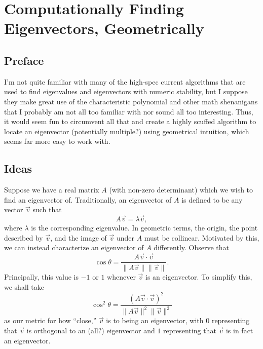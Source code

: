 \documentclass[a4paper, 12pt]{article}
\begin{document}
\section*{Computationally Finding Eigenvectors, Geometrically}

\subsection*{Preface}
I'm not quite familiar with many of the high-spec current algorithms that are used to find eigenvalues and eigenvectors with numeric stability, but I suppose they make great use of the characteristic polynomial and other math shenanigans that I probably am not all too familiar with nor sound all too interesting. Thus, it would seem fun to circumvent all that and create a highly scuffed algorithm to locate an eigenvector (potentially multiple?) using geometrical intuition, which seems far more easy to work with.

\subsection*{Ideas}
Suppose we have a real matrix \( A \) (with non-zero determinant) which we wish to find an eigenvector of. Traditionally, an eigenvector of \( A \) is defined to be any vector \( \vec{v} \) such that
\[
    A \vec{v} = \lambda \vec{v}
,\]
where \( \lambda \) is the corresponding eigenvalue. In geometric terms, the origin, the point described by \( \vec{v} \), and the image of \( \vec{v} \) under \( A \) must be collinear. Motivated by this, we can instead characterize an eigenvector of \( A \) differently. Observe that
\[
    \cos{\theta} = \frac{A\vec{v} \cdot \vec{v}}{\| A \vec{v} \| \| \vec{v} \|}
.\]
Principally, this value is \( -1 \) or \( 1 \) whenever \( \vec{v} \) is an eigenvector. To simplify this, we shall take
\[
    \cos^2{\theta} = \frac{( A\vec{v} \cdot \vec{v} )^2}{\| A \vec{v} \|^2 \| \vec{v} \|^2}
\]
as our metric for how ``close,'' \( \vec{v} \) is to being an eigenvector, with \( 0 \) representing that \( \vec{v} \) is orthogonal to an (all?) eigenvector and \( 1 \) representing that \( \vec{v} \) is in fact an eigenvector.
\end{document}
